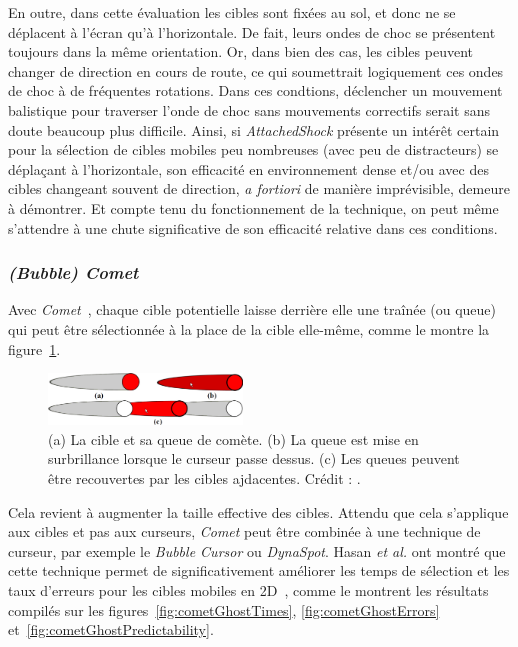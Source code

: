 	En outre, dans cette évaluation les cibles sont fixées au sol, et donc ne se déplacent à l'écran qu'à l'horizontale. De fait, leurs ondes de choc se présentent toujours dans la même orientation. Or, dans bien des cas, les cibles peuvent changer de direction en cours de route, ce qui soumettrait logiquement ces ondes de choc à de fréquentes rotations. Dans ces condtions, déclencher un mouvement balistique pour traverser l'onde de choc sans mouvements correctifs serait sans doute beaucoup plus difficile.	Ainsi, si \emph{AttachedShock} présente un intérêt certain pour la sélection de cibles mobiles peu nombreuses (avec peu de distracteurs) se déplaçant à l'horizontale, son efficacité en environnement dense et/ou avec des cibles changeant souvent de direction, \emph{a fortiori} de manière imprévisible, demeure à démontrer. Et compte tenu du fonctionnement de la technique, on peut même s'attendre à une chute significative de son efficacité relative dans ces conditions.	
	
	\subsubsection{\emph{(Bubble) Comet}}
	Avec \emph{Comet}~\cite{hasan2011comet}, chaque cible potentielle laisse derrière elle une traînée (ou queue) qui peut être sélectionnée à la place de la cible elle-même, comme le montre la figure~\ref{fig:comet}.

	\begin{figure}
		\centering
		\includegraphics[width=0.46\textwidth]{figures/ch2/comet}
		\caption[La technique \emph{Comet}]{(a) La cible et sa queue de comète. (b) La queue est mise en surbrillance lorsque le curseur passe dessus. (c) Les queues peuvent être recouvertes par les cibles ajdacentes. Crédit : \cite{hasan2011comet}.}
		\label{fig:comet}
	\end{figure}
	
	Cela revient à augmenter la taille effective des cibles. Attendu que cela s'applique aux cibles et pas aux curseurs, \emph{Comet} peut être combinée à une technique de curseur, par exemple le \emph{Bubble Cursor} ou \emph{DynaSpot}. Hasan \emph{et al.} ont montré que cette technique permet de significativement améliorer les temps de sélection et les taux d'erreurs pour les cibles mobiles en 2D~\cite{hasan2011comet}, comme le montrent les résultats compilés sur les figures~\ref{fig:cometGhostTimes}, \ref{fig:cometGhostErrors} et~\ref{fig:cometGhostPredictability}.

